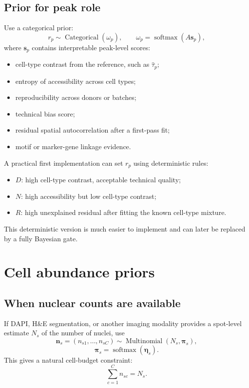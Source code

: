 \documentclass[11pt]{article}
\newcommand{\Cat}{\operatorname{Categorical}}
\newcommand{\softmax}{\operatorname{softmax}}
\begin{document}
\subsection{Prior for peak role}

Use a categorical prior:
\[
r_p\sim\Cat(\omega_p),
\qquad
\omega_p=\softmax(A\mathbf{s}_p),
\]
where $\mathbf{s}_p$ contains interpretable peak-level scores:
\begin{itemize}
    \item cell-type contrast from the reference, such as $\widehat{\tau}_p$;
    \item entropy of accessibility across cell types;
    \item reproducibility across donors or batches;
    \item technical bias score;
    \item residual spatial autocorrelation after a first-pass fit;
    \item motif or marker-gene linkage evidence.
\end{itemize}

A practical first implementation can set $r_p$ using deterministic rules:
\begin{itemize}
    \item $D$: high cell-type contrast, acceptable technical quality;
    \item $N$: high accessibility but low cell-type contrast;
    \item $R$: high unexplained residual after fitting the known cell-type mixture.
\end{itemize}

This deterministic version is much easier to implement and can later be replaced by a fully Bayesian gate.

\section{Cell abundance priors}

\subsection{When nuclear counts are available}

If DAPI, H\&E segmentation, or another imaging modality provides a spot-level estimate $N_s$ of the number of nuclei, use
\[
\mathbf{n}_s=(n_{s1},\ldots,n_{sC})\sim\operatorname{Multinomial}(N_s,\boldsymbol{\pi}_s),
\]
\[
\boldsymbol{\pi}_s=\softmax(\boldsymbol{\eta}_s).
\]
This gives a natural cell-budget constraint:
\[
\sum_{c=1}^C n_{sc}=N_s.
\]
\end{document}
